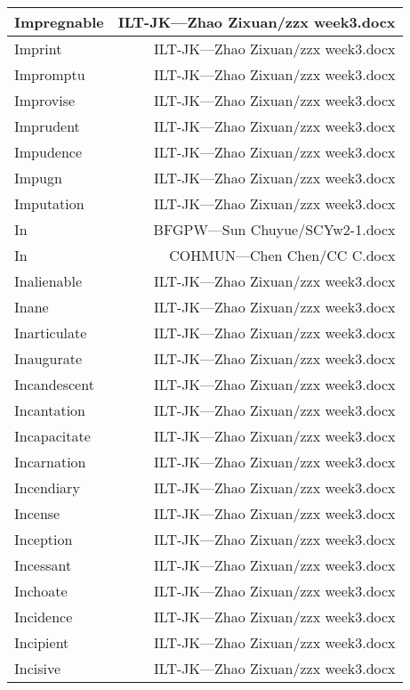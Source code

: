 \documentclass{article}
\begin{document}
\begin{center}
\begin{longtable}{|l|r|}
\hline
Impregnable  &  ILT-JK---Zhao Zixuan/zzx week3.docx\\  
\hline
Imprint  &  ILT-JK---Zhao Zixuan/zzx week3.docx\\  
\hline
Impromptu  &  ILT-JK---Zhao Zixuan/zzx week3.docx\\  
\hline
Improvise  &  ILT-JK---Zhao Zixuan/zzx week3.docx\\  
\hline
Imprudent  &  ILT-JK---Zhao Zixuan/zzx week3.docx\\  
\hline
Impudence  &  ILT-JK---Zhao Zixuan/zzx week3.docx\\  
\hline
Impugn  &  ILT-JK---Zhao Zixuan/zzx week3.docx\\  
\hline
Imputation  &  ILT-JK---Zhao Zixuan/zzx week3.docx\\  
\hline
In  &  BFGPW---Sun Chuyue/SCYw2-1.docx\\  
\hline
In  &  COHMUN---Chen Chen/CC C.docx\\  
\hline
Inalienable  &  ILT-JK---Zhao Zixuan/zzx week3.docx\\  
\hline
Inane  &  ILT-JK---Zhao Zixuan/zzx week3.docx\\  
\hline
Inarticulate  &  ILT-JK---Zhao Zixuan/zzx week3.docx\\  
\hline
Inaugurate  &  ILT-JK---Zhao Zixuan/zzx week3.docx\\  
\hline
Incandescent  &  ILT-JK---Zhao Zixuan/zzx week3.docx\\  
\hline
Incantation  &  ILT-JK---Zhao Zixuan/zzx week3.docx\\  
\hline
Incapacitate  &  ILT-JK---Zhao Zixuan/zzx week3.docx\\  
\hline
Incarnation  &  ILT-JK---Zhao Zixuan/zzx week3.docx\\  
\hline
Incendiary  &  ILT-JK---Zhao Zixuan/zzx week3.docx\\  
\hline
Incense  &  ILT-JK---Zhao Zixuan/zzx week3.docx\\  
\hline
Inception  &  ILT-JK---Zhao Zixuan/zzx week3.docx\\  
\hline
Incessant  &  ILT-JK---Zhao Zixuan/zzx week3.docx\\  
\hline
Inchoate  &  ILT-JK---Zhao Zixuan/zzx week3.docx\\  
\hline
Incidence  &  ILT-JK---Zhao Zixuan/zzx week3.docx\\  
\hline
Incipient  &  ILT-JK---Zhao Zixuan/zzx week3.docx\\  
\hline
Incisive  &  ILT-JK---Zhao Zixuan/zzx week3.docx\\  

\end{longtable}
\end{center}
\end{document}

